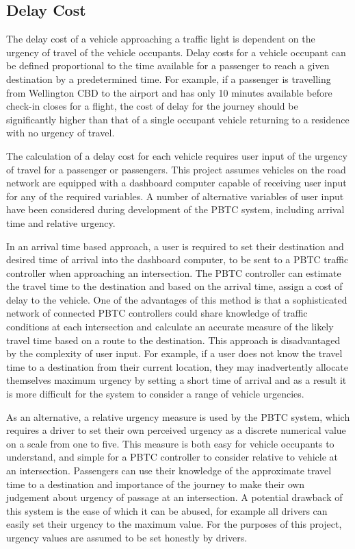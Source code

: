 \subsection{Delay Cost}
\label{sec:design_delay_cost}

The delay cost of a vehicle approaching a traffic light is dependent on the urgency of travel of the vehicle occupants. Delay costs for a vehicle occupant can be defined proportional to the time available for a passenger to reach a given destination by a predetermined time. For example, if a passenger is travelling from Wellington CBD to the airport and has only 10 minutes available before check-in closes for a flight, the cost of delay for the journey should be significantly higher than that of a single occupant vehicle returning to a residence with no urgency of travel. 

The calculation of a delay cost for each vehicle requires user input of the urgency of travel for a passenger or passengers. This project assumes vehicles on the road network are equipped with a dashboard computer capable of receiving user input for any of the required variables. A number of alternative variables of user input have been considered during development of the PBTC system, including arrival time and relative urgency. 

In an arrival time based approach, a user is required to set their destination and desired time of arrival into the dashboard computer, to be sent to a PBTC traffic controller when approaching an intersection. The PBTC controller can estimate the travel time to the destination and based on the arrival time, assign a cost of delay to the vehicle. One of the advantages of this method is that a sophisticated network of connected PBTC controllers could share knowledge of traffic conditions at each intersection and calculate an accurate measure of the likely travel time based on a route to the destination. This approach is disadvantaged by the complexity of user input. For example, if a user does not know the travel time to a destination from their current location, they may inadvertently allocate themselves maximum urgency by setting a short time of arrival and as a result it is more difficult for the system to consider a range of vehicle urgencies.

As an alternative, a relative urgency measure is used by the PBTC system, which requires a driver to set their own perceived urgency as a discrete numerical value on a scale from one to five. This measure is both easy for vehicle occupants to understand, and simple for a PBTC controller to consider relative to vehicle at an intersection. Passengers can use their knowledge of the approximate travel time to a destination and importance of the journey to make their own judgement about urgency of passage at an intersection. A potential drawback of this system is the ease of which it can be abused, for example all drivers can easily set their urgency to the maximum value. For the purposes of this project, urgency values are assumed to be set honestly by drivers.

